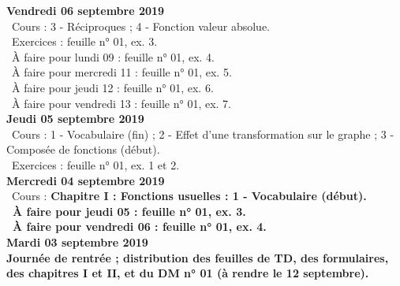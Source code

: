 \documentclass[12pt,a4paper]{article}
\begin{document}
\noindent\textbf{Vendredi 06 septembre 2019}\\
\bu\ Cours : 3 - Réciproques ; 4 - Fonction valeur absolue.\\
\bu\ Exercices : feuille n° 01, ex. 3.\\
\bu\ À faire pour lundi 09 : feuille n° 01, ex. 4.\\
\bu\ À faire pour mercredi 11 : feuille n° 01, ex. 5.\\
\bu\ À faire pour jeudi 12 : feuille n° 01, ex. 6.\\
\bu\ À faire pour vendredi 13 : feuille n° 01, ex. 7.\vspace{.4cm}\\
 
\noindent\textbf{\bf Jeudi 05 septembre 2019}\\
\bu\ Cours : 1 - Vocabulaire (fin) ; 2 - Effet d'une transformation sur le graphe ; 3 - Composée de fonctions 
(début).\\
\bu\ Exercices : feuille n° 01, ex. 1 et 2.\vspace{.4cm}\\
     
\noindent\textbf{\bf Mercredi 04 septembre 2019}\\
\bu\ Cours : \bf Chapitre I \rm : Fonctions usuelles : 1 - Vocabulaire (début).\\
\bu\ À faire pour jeudi 05 : feuille n° 01, ex. 3.\\
\bu\ À faire pour vendredi 06 : feuille n° 01, ex. 4.\vspace{.4cm}\\
 

\noindent\textbf{\bf Mardi 03 septembre 2019}\\
Journée de rentrée ; distribution des feuilles de TD, des formulaires, des
chapitres I et II, et du DM n° 01 (à rendre le 12 septembre).\vspace{.4cm}\\


\label{end}
\end{document}
